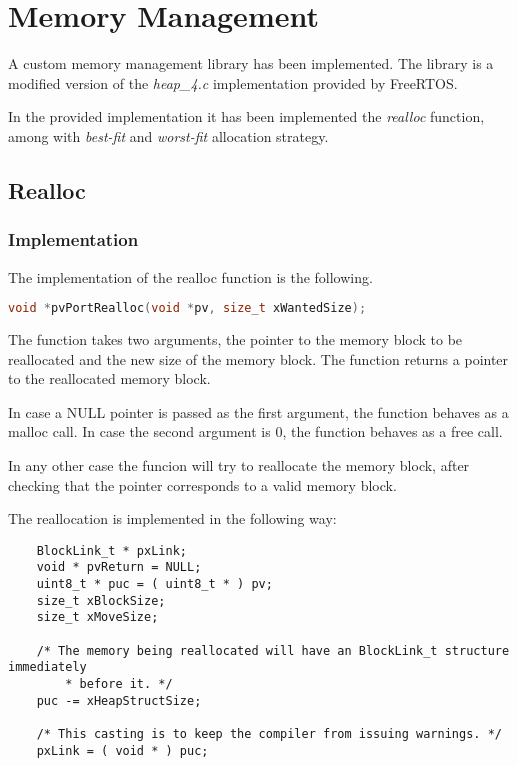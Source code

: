 \section{Memory Management}

A custom memory management library has been implemented. The library is a modified version of the \textit{heap\_4.c} implementation provided by FreeRTOS.

In the provided implementation it has been implemented the \textit{realloc} function, among with \textit{best-fit} and \textit{worst-fit} allocation strategy.

\subsection{Realloc}
    \subsubsection{Implementation}
    The implementation of the realloc function is the following.

    \begin{codebox}
    \begin{lstlisting}[language=c,breaklines]
    void *pvPortRealloc(void *pv, size_t xWantedSize);
    \end{lstlisting}
    \end{codebox}

    The function takes two arguments, the pointer to the memory block to be reallocated and the new size of the memory block. The function returns a pointer to the reallocated memory block.

    In case a NULL pointer is passed as the first argument, the function behaves as a malloc call. In case the second argument is 0, the function behaves as a free call.
    
    In any other case the funcion will try to reallocate the memory block, after checking that the pointer corresponds to a valid memory block.

    The reallocation is implemented in the following way:

    \begin{codebox}
    \begin{lstlisting}
    BlockLink_t * pxLink;
    void * pvReturn = NULL;
    uint8_t * puc = ( uint8_t * ) pv;
    size_t xBlockSize;
    size_t xMoveSize;

    /* The memory being reallocated will have an BlockLink_t structure immediately
        * before it. */
    puc -= xHeapStructSize;

    /* This casting is to keep the compiler from issuing warnings. */
    pxLink = ( void * ) puc;
    \end{lstlisting}
    \end{codebox}

